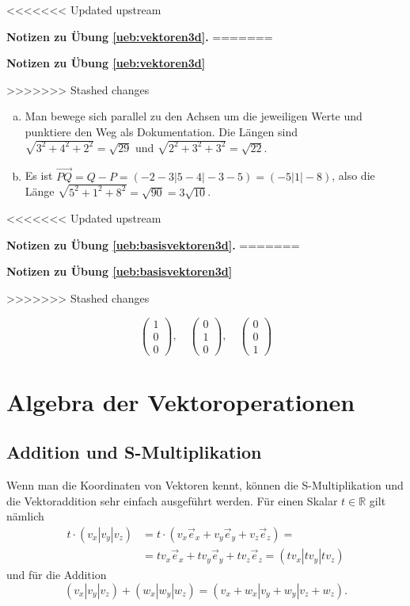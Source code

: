 \documentclass[%
11pt,%
twoside,%
titlepage,%
<<<<<<< Updated upstream
german,%
=======
swissgerman,%
>>>>>>> Stashed changes
headsepline%
]{scrartcl}
\newcommand{\faReturnGray}{\textcolor{gray}{\faMailReply}} %
\theoremstyle{definition}
\theoremstyle{plain}
\newcommand{\concatueb}[1]{ueb:#1}%
\newcommand{\concatlsg}[1]{lsg:#1}%
\newenvironment{lsg}[1]{%
<<<<<<< Updated upstream
    \par\noindent\textbf{Notizen zu Übung \ref{\concatueb{#1}}.}%
    \label{\concatlsg{#1}}
=======
    \par\noindent\textbf{Notizen zu Übung \ref{\concatueb{#1}}}\label{\concatlsg{#1}}
    \hfill\hyperref[\concatueb{#1}]{\faReturnGray}\par %
>>>>>>> Stashed changes
}{%
    \par%
}
\begin{document}
\begin{lsg}{vektoren3d}
    \begin{enumerate}[a)]
        \item Man bewege sich parallel zu den Achsen um die jeweiligen Werte und punktiere den Weg als Dokumentation. Die Längen sind $\sqrt{3^2+4^2+2^2}=\sqrt{29}$ und $\sqrt{2^2+3^2+3^2}=\sqrt{22}$.
        \item Es ist $\vec{PQ}=Q-P=(-2-3|5-4|-3-5)=(-5|1|-8)$, also die Länge $\sqrt{5^2+1^2+8^2}=\sqrt{90}=3\sqrt{10}$.
    \end{enumerate}
\end{lsg}
\begin{lsg}{basisvektoren3d}
    $$\begin{pmatrix}
        1\\0\\0
    \end{pmatrix},\quad\begin{pmatrix}
        0\\1\\0
    \end{pmatrix},\quad\begin{pmatrix}
        0\\0\\1
    \end{pmatrix}$$
\end{lsg}

\clearpage

\section{Algebra der Vektoroperationen}

\subsection{Addition und S-Multiplikation}

Wenn man die Koordinaten von Vektoren kennt, können die S-Multiplikation und die Vektoraddition sehr einfach ausgeführt werden. Für
einen Skalar $t\in\mathbb{R}$ gilt nämlich
\begin{align*}
t\cdot(v_x|v_y|v_z)&=t\cdot(v_x\vec{e}_x+v_y\vec{e}_y+v_z\vec{e}_z)=\\
&=tv_x\vec{e}_x+tv_y\vec{e}_y+tv_z\vec{e}_z=(tv_x|tv_y|tv_z)
\end{align*}
und für die Addition
$$(v_x|v_y|v_z)+(w_x|w_y|w_z)=(v_x+w_x|v_y+w_y|v_z+w_z).$$
\end{document}
